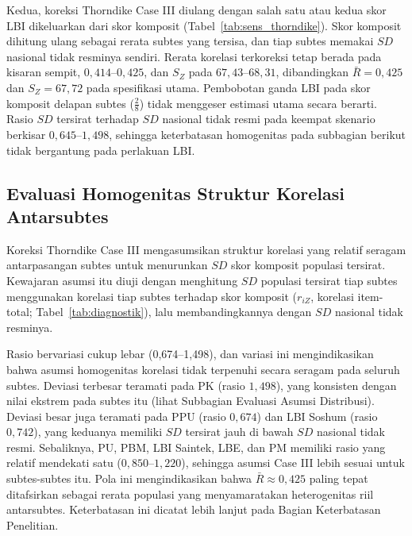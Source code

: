 

Kedua, koreksi Thorndike Case III diulang dengan salah satu atau kedua skor LBI dikeluarkan dari skor komposit (Tabel~\ref{tab:sens_thorndike}). Skor komposit dihitung ulang sebagai rerata subtes yang tersisa, dan tiap subtes memakai $SD$ nasional tidak resminya sendiri. Rerata korelasi terkoreksi tetap berada pada kisaran sempit, $0,414$--$0,425$, dan $S_Z$ pada $67,43$--$68,31$, dibandingkan $\bar{R} = 0,425$ dan $S_Z = 67,72$ pada spesifikasi utama. Pembobotan ganda LBI pada skor komposit delapan subtes ($\frac{2}{8}$) tidak menggeser estimasi utama secara berarti. Rasio $SD$ tersirat terhadap $SD$ nasional tidak resmi pada keempat skenario berkisar $0,645$--$1,498$, sehingga keterbatasan homogenitas pada subbagian berikut tidak bergantung pada perlakuan LBI.



\subsection{Evaluasi Homogenitas Struktur Korelasi Antarsubtes}
Koreksi Thorndike Case III mengasumsikan struktur korelasi yang relatif seragam antarpasangan subtes untuk menurunkan $SD$ skor komposit populasi tersirat. Kewajaran asumsi itu diuji dengan menghitung $SD$ populasi tersirat tiap subtes menggunakan korelasi tiap subtes terhadap skor komposit ($r_{iZ}$, korelasi item-total; Tabel~\ref{tab:diagnostik}), lalu membandingkannya dengan $SD$ nasional tidak resminya.



Rasio bervariasi cukup lebar (0,674--1,498), dan variasi ini mengindikasikan bahwa asumsi homogenitas korelasi tidak terpenuhi secara seragam pada seluruh subtes. Deviasi terbesar teramati pada PK (rasio $1,498$), yang konsisten dengan nilai ekstrem pada subtes itu (lihat Subbagian Evaluasi Asumsi Distribusi). Deviasi besar juga teramati pada PPU (rasio $0,674$) dan LBI Soshum (rasio $0,742$), yang keduanya memiliki $SD$ tersirat jauh di bawah $SD$ nasional tidak resmi. Sebaliknya, PU, PBM, LBI Saintek, LBE, dan PM memiliki rasio yang relatif mendekati satu ($0,850$--$1,220$), sehingga asumsi Case III lebih sesuai untuk subtes-subtes itu. Pola ini mengindikasikan bahwa $\bar{R} \approx 0,425$ paling tepat ditafsirkan sebagai rerata populasi yang menyamaratakan heterogenitas riil antarsubtes. Keterbatasan ini dicatat lebih lanjut pada Bagian Keterbatasan Penelitian.

